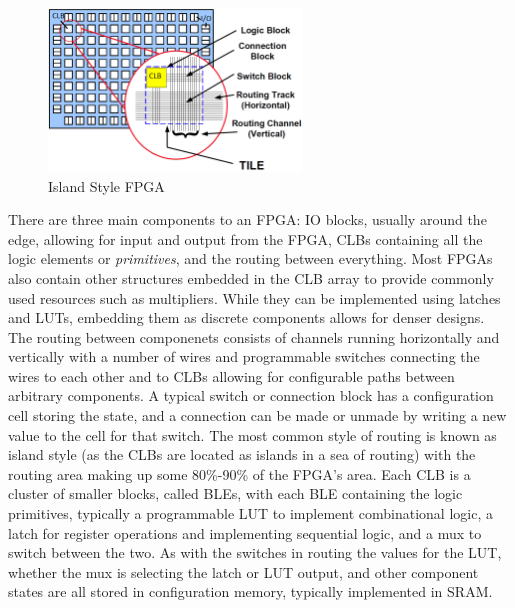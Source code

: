 \documentclass[12pt,final,oneside]{memoir} %
\begin{document}
\begin{figure}
    \begin{center}
        \includegraphics[width=0.6\textwidth]{images/fpga-arch.png}
        \caption{Island Style FPGA\cite{WiltonLecture}}
        \label{FPGAArch}
    \end{center}
\end{figure}

There are three main components to an \ac{FPGA}: \ac{IO} blocks, usually around the edge, allowing for input and output from the \ac{FPGA}, \acp{CLB} containing all the logic elements or \emph{primitives}, and the routing between everything.
Most \acp{FPGA} also contain other structures embedded in the \ac{CLB} array to provide commonly used resources such as multipliers. While they can be implemented using latches and \acp{LUT}, embedding them as discrete components allows for denser designs.
The routing between componenets consists of channels running horizontally and vertically with a number of wires and programmable switches connecting the wires to each other and to \acp{CLB} allowing for configurable paths between arbitrary components. A typical switch or connection block has a configuration cell storing the state, and a connection can be made or unmade by writing a new value to the cell for that switch. The most common style of routing is known as island style (as the \acp{CLB} are located as islands in a sea of routing) with the routing area making up some 80\%-90\% of the \ac{FPGA}'s area\cite{FPGAArch}.
Each \ac{CLB} is a cluster of smaller blocks, called \acp{BLE}, with each \ac{BLE} containing the logic primitives, typically a programmable \ac{LUT} to implement combinational logic, a latch for register operations and implementing sequential logic, and a \ac{mux} to switch between the two. As with the switches in routing the values for the \ac{LUT}, whether the \ac{mux} is selecting the latch or \ac{LUT} output, and other component states are all stored in configuration memory, typically implemented in \acs{SRAM}.
\end{document}
